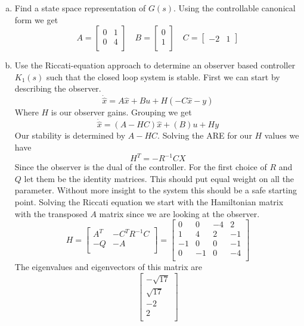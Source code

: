 \documentclass{article}
\begin{document}
\begin{enumerate}[(a)]
\item Find a state space representation of $G(s)$.
\newline
Using the controllable canonical form we get
$$
A =
\begin{bmatrix}
0 & 1 \\
0 & 4 \\
\end{bmatrix}
\quad
B =
\begin{bmatrix}
0 \\
1 \\
\end{bmatrix}
\quad
C =
\begin{bmatrix} -2 & 1 \end{bmatrix}
$$

\item Use the Riccati-equation approach to determine an observer based controller $K_1(s)$ such that the closed loop system is stable.
\newline
First we can start by describing the observer.
$$ \dot{\hat{x}} = A \hat{x} + Bu + H(-C\hat{x} -y) $$
Where $H$ is our observer gains.
Grouping we get
$$ \dot{\hat{x}} = (A - HC)\hat{x} + (B)u +Hy $$
Our stability is determined by $A-HC$.
Solving the ARE for our $H$ values we have
$$ H^T = -R^{-1}CX $$
Since the observer is the dual of the controller.
For the first choice of $R$ and $Q$ let them be the identity matrices.
This should put equal weight on all the parameter.
Without more insight to the system this should be a safe starting point.
Solving the Riccati equation we start with the Hamiltonian matrix with the transposed $A$ matrix since we are looking at the observer.
$$
H =
\begin{bmatrix}
A^T & -C^TR^{-1}C \\
-Q & -A \\
\end{bmatrix}
=
\begin{bmatrix}
0 & 0 & -4 & 2 \\
1 & 4 & 2 & -1 \\
-1 & 0 & 0 & -1 \\
0 & -1 & 0 & -4 \\
\end{bmatrix}
$$
The eigenvalues and eigenvectors of this matrix are
$$
\begin{bmatrix}
-\sqrt{17} \\
\sqrt{17} \\
-2 \\
2 \\

\end{bmatrix}$$
\end{enumerate}
\end{document}
